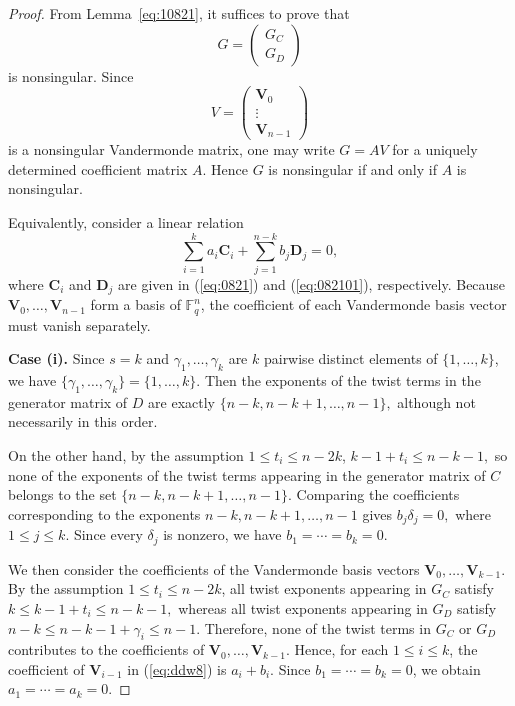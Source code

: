 \documentclass[12pt,draftcls,journal,onecolumn]{IEEEtran}
\newcommand{\F}{{\mathbb{F}}}
\begin{document}
\begin{proof}
From Lemma~\ref{eq:10821}, it suffices to prove that
\[
G=
\begin{pmatrix}
G_C\\
G_D
\end{pmatrix}
\]
is nonsingular. Since
\[
V=
\begin{pmatrix}
\mathbf{V}_0\\
\vdots\\
\mathbf{V}_{n-1}
\end{pmatrix}
\]
is a nonsingular Vandermonde matrix, one may write \(G=AV\) for a uniquely determined coefficient matrix \(A\). Hence \(G\) is nonsingular if and only if \(A\) is nonsingular.

Equivalently, consider a linear relation
\begin{equation}\label{eq:ddw8}
\sum_{i=1}^{k}a_i\mathbf{C}_i
+
\sum_{j=1}^{n-k}b_j\mathbf{D}_j
=0,
\end{equation}
where \(\mathbf{C}_i\) and \(\mathbf{D}_j\) are given in
(\ref{eq:0821}) and (\ref{eq:082101}), respectively.
Because \(\mathbf{V}_0,\ldots,\mathbf{V}_{n-1}\) form a basis of \(\F_q^n\), the coefficient of each Vandermonde basis vector must vanish separately.

\medskip
\noindent\textbf{Case (i).}
Since \(s=k\) and \(\gamma_1,\ldots,\gamma_k\) are \(k\) pairwise distinct elements of \(\{1,\ldots,k\}\), we have
\(
\{\gamma_1,\ldots,\gamma_k\}=\{1,\ldots,k\}.
\)
Then the exponents of the twist terms in the generator matrix of \(D\) are exactly
\(
\{n-k,n-k+1,\ldots,n-1\},
\)
although not necessarily in this order.

On the other hand, by the assumption \(1\le t_i\le n-2k\),
\(
k-1+t_i\le n-k-1,
\)
so none of the exponents of the twist terms appearing in the generator matrix of \(C\) belongs to the set \(\{n-k,n-k+1,\ldots,n-1\}\). Comparing the coefficients corresponding to the exponents \(n-k,n-k+1,\ldots,n-1\) gives
$
b_j\delta_j=0,
$
where \(1\le j\le k\).
Since every \(\delta_j\) is nonzero, we have
\(
b_1=\cdots=b_k=0.
\)

We then consider the coefficients of the Vandermonde basis vectors
\(
\mathbf{V}_0,\ldots,\mathbf{V}_{k-1}.
\)
By the assumption \(1\le t_i\le n-2k\), all twist exponents appearing in \(G_C\) satisfy
\(
k\le k-1+t_i\le n-k-1,
\)
whereas all twist exponents appearing in \(G_D\) satisfy
\(
n-k\le n-k-1+\gamma_i\le n-1.
\)
Therefore, none of the twist terms in \(G_C\) or \(G_D\) contributes to the coefficients of
\(
\mathbf{V}_0,\ldots,\mathbf{V}_{k-1}.
\)
Hence, for each \(1\le i\le k\), the coefficient of \(\mathbf{V}_{i-1}\) in (\ref{eq:ddw8}) is
\(
a_i+b_i.
\)
Since \(b_1=\cdots=b_k=0\), we obtain
\(
a_1=\cdots=a_k=0.
\)


\end{proof}
\end{document}
